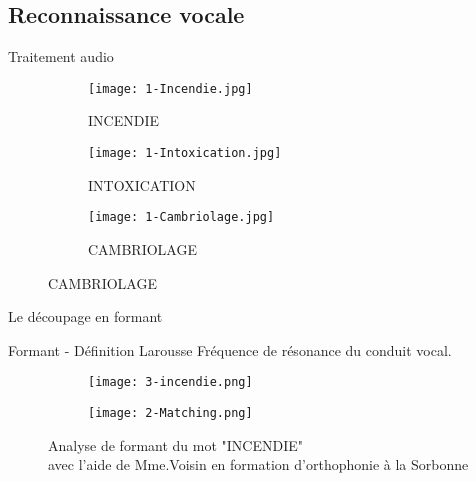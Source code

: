 \subsection{Reconnaissance vocale}

\begin{frame}{Traitement audio}
	\begin{figure}
		\begin{subfigure}[]{0.32\textwidth}
			\texttt{[image: 1-Incendie.jpg]}
			\caption{INCENDIE}
		\end{subfigure}
		\begin{subfigure}[]{0.32\textwidth}
			\texttt{[image: 1-Intoxication.jpg]}
			\caption{INTOXICATION}
		\end{subfigure}
		\begin{subfigure}[]{0.32\textwidth}
			\texttt{[image: 1-Cambriolage.jpg]}
			\caption{CAMBRIOLAGE}
		\end{subfigure}
	\end{figure}
\end{frame}



\begin{frame}{Le découpage en formant}
	\begin{block}{Formant - Définition Larousse}
		Fréquence de résonance du conduit vocal. \\
	\end{block}
	\begin{figure}
		\centering
		\begin{subfigure}[]{0.55\textwidth}
			\texttt{[image: 3-incendie.png]}
		\end{subfigure}
		\begin{subfigure}[]{0.44\textwidth}
			\texttt{[image: 2-Matching.png]}
		\end{subfigure}
		\caption{Analyse de formant du mot "INCENDIE" \\avec l'aide de Mme.Voisin en formation d'orthophonie à la Sorbonne}
	\end{figure}
\end{frame}
